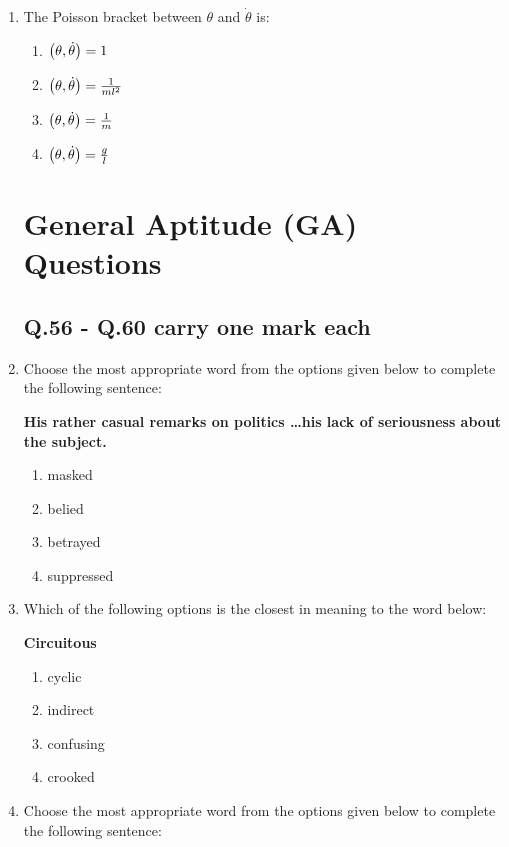 \documentclass[journal,12pt,twocolumn]{IEEEtran}
\theoremstyle{remark}
\begin{document}
\begin{enumerate}[start=53]
 
    \item The Poisson bracket between $ \theta $ and $ \dot{\theta} $ is:

    \begin{enumerate}
        \item $\left(\theta, \dot{\theta}\right) = 1$
        \item $\left(\theta, \dot{\theta}\right) = \frac{1}{m l^2}$
         \item $\left(\theta, \dot{\theta}\right) = \frac{1}{m}$
        \item $\left(\theta, \dot{\theta}\right) = \frac{g}{l}$
    \end{enumerate}

   
\section{General Aptitude (GA) Questions}

\subsection{Q.56 - Q.60 carry one mark each}


    \item Choose the most appropriate word from the options given below to complete the following sentence:

   \textbf{ His rather casual remarks on politics \dots his lack of seriousness about the subject.}

    \begin{enumerate}
        \item masked
        \item belied
        \item betrayed
        \item suppressed
    \end{enumerate}

    \item Which of the following options is the closest in meaning to the word below: 

    \textbf{Circuitous}

    \begin{enumerate}
        \item cyclic
        \item indirect
        \item confusing
        \item crooked
    \end{enumerate}

    \item Choose the most appropriate word from the options given below to complete the following sentence:


\end{enumerate}
\end{document}
